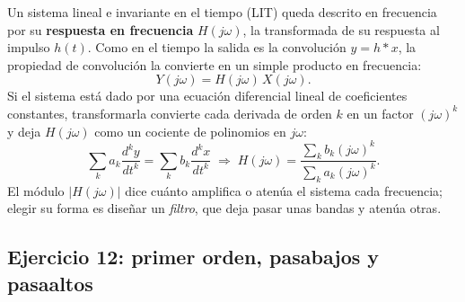 \documentclass[10pt,a4paper]{article}
\begin{document}
	Un sistema lineal e invariante en el tiempo (LIT) queda descrito en frecuencia por su \textbf{respuesta en frecuencia} $H(j\omega)$, la transformada de su respuesta al impulso $h(t)$. Como en el tiempo la salida es la convolución $y=h*x$, la propiedad de convolución la convierte en un simple producto en frecuencia:
	\[
		Y(j\omega) = H(j\omega)\,X(j\omega).
	\]
	Si el sistema está dado por una ecuación diferencial lineal de coeficientes constantes, transformarla convierte cada derivada de orden $k$ en un factor $(j\omega)^k$ y deja $H(j\omega)$ como un cociente de polinomios en $j\omega$:
	\[
		\sum_k a_k \frac{d^k y}{dt^k} = \sum_k b_k \frac{d^k x}{dt^k}
		\;\Longrightarrow\;
		H(j\omega) = \frac{\sum_k b_k (j\omega)^k}{\sum_k a_k (j\omega)^k}.
	\]
	El módulo $|H(j\omega)|$ dice cuánto amplifica o atenúa el sistema cada frecuencia; elegir su forma es diseñar un \emph{filtro}, que deja pasar unas bandas y atenúa otras.

	\subsection*{Ejercicio 12: primer orden, pasabajos y pasaaltos}
\end{document}
